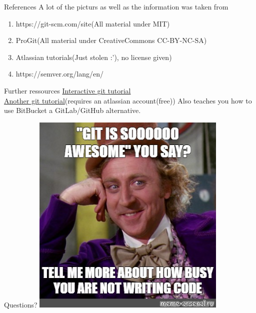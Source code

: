 \documentclass{beamer}
\begin{document}
\begin{frame}[fragile,t]{References}\vspace{10pt}
  A lot of the picturs as well as the information was taken from\\
  \begin{enumerate}
    \item https://git-scm.com/site(All material under MIT)
    \item ProGit(All material under CreativeCommons CC-BY-NC-SA)
    \item Atlassian tutorials(Just stolen :'), no license given)
    \item https://semver.org/lang/en/
  \end{enumerate}
\end{frame}

\begin{frame}[fragile,t]{Further ressources}\vspace{10pt}
  \href{https://learngitbranching.js.org/?locale=en_US}{Interactive git tutorial}\vspace{10pt}\\
  \href{https://www.atlassian.com/git/tutorials/learn-git-with-bitbucket-cloud}{Another git tutorial}(requires an atlassian account(free))
  Also teaches you how to use BitBucket a GitLab/GitHub alternative.
\end{frame}

\begin{frame}{Questions?}
  \centering
      \includegraphics[width=0.7\textwidth,height=0.7\textheight]{memes/git_awesome.jpg}
\end{frame}
\end{document}
